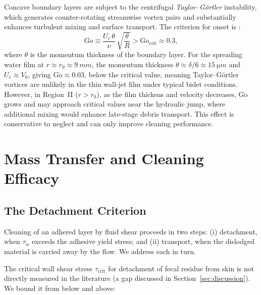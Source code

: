 \documentclass[aps,prfluids,reprint,amsmath,amssymb,floatfix]{revtex4-2}
\newcommand{\Go}{\mathrm{G\ddot{o}}}
\begin{document}
Concave boundary layers are subject to the centrifugal \emph{Taylor--G\"ortler}
instability, which generates counter-rotating streamwise vortex pairs and
substantially enhances turbulent mixing and surface transport. The criterion
for onset is \citep{Hall1982}:
\begin{equation}
    \Go \equiv \frac{U_e\,\theta}{\nu}\,\sqrt{\frac{\theta}{R}} > \Go_\mathrm{crit}
    \approx 0.3,
    \label{eq:goertler}
\end{equation}
where $\theta$ is the momentum thickness of the boundary layer. For the
spreading water film at $r \approx r_0 \approx \SI{9}{mm}$, the momentum
thickness $\theta \approx \delta/6 \approx \SI{15}{\micro m}$ and
$U_e \approx V_0$, giving $\Go \approx 0.03$, below the critical value,
meaning Taylor--G\"ortler vortices are unlikely in the thin wall-jet film
under typical bidet conditions. However, in Region~II ($r > r_0$), as the
film thickens and velocity decreases, $\Go$ grows and may approach critical
values near the hydraulic jump, where additional mixing would enhance late-stage
debris transport. This effect is conservative to neglect and can only improve
cleaning performance.

\section{Mass Transfer and Cleaning Efficacy}
\label{sec:mass}

\subsection{The Detachment Criterion}
\label{subsec:detach}

Cleaning of an adhered layer by fluid shear proceeds in two steps:
(i) detachment, when $\tau_w$ exceeds the adhesive yield stress; and
(ii) transport, when the dislodged material is carried away by the flow.
We address each in turn.

The critical wall shear stress $\tau_\mathrm{crit}$ for detachment of
fecal residue from skin is not directly measured in the literature (a gap
discussed in Section~\ref{sec:discussion}). We bound it from below and
above:
\end{document}

